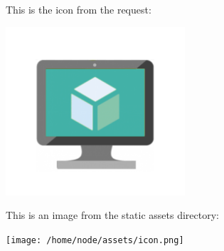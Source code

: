 This is the icon from the request:

\includegraphics[width=0.5\textwidth]{graphic.png}

This is an image from the static assets directory:

\texttt{[image: /home/node/assets/icon.png]}
